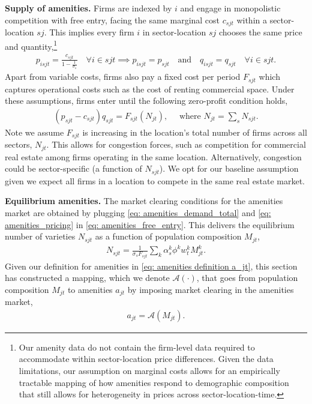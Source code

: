 \documentclass[11pt]{article}
\newcommand{\Paragraph}{\vspace{0.1cm}\noindent\textbf}
\begin{document}
\Paragraph{Supply of amenities.} Firms are indexed by $i$ and engage in monopolistic competition with free entry, facing the same marginal cost $c_{sjt}$ within a sector-location $sj$. This implies every firm $i$ in sector-location $sj$ chooses the same price and quantity,\footnote{Our amenity data do not contain the firm-level data required to accommodate within sector-location price differences. Given the data limitations, our assumption on marginal costs allows for an empirically tractable mapping of how amenities respond to demographic composition that still allows for heterogeneity in prices across sector-location-time.}
\begin{align}\label{eq: amenities_pricing}
    p_{isjt} = \frac{c_{sjt}}{1-\frac{1}{\sigma_s}} \quad \forall i \in sjt \implies p_{isjt} = p_{sjt} \quad \text{and} \quad q_{isjt} = q_{sjt} \quad \forall i \in sjt.
\end{align}
Apart from variable costs, firms also pay a fixed cost per period $F_{sjt}$ which captures operational costs such as the cost of renting commercial space. Under these assumptions, firms enter until the following zero-profit condition holds, 
\begin{align}\label{eq: amenities_free_entry}
     (p_{sjt}-c_{sjt})q_{sjt} = F_{sjt}(N_{jt}),\quad \text{ where } N_{jt}=\sum_s N_{sjt}.
\end{align}
Note we assume $F_{sjt}$ is increasing in the location's total number of firms across all sectors, $N_{jt}$. This allows for congestion forces, such as competition for commercial real estate among firms operating in the same location. Alternatively, congestion could be sector-specific (a function of $N_{sjt}$). We opt for our baseline assumption given we expect all firms in a location to compete in the same real estate market.

\Paragraph{Equilibrium amenities.} The market clearing conditions for the amenities market are obtained by plugging \ref{eq: amenities_demand_total} and \ref{eq: amenities_pricing} in \ref{eq: amenities_free_entry}. This delivers the equilibrium number of varieties $N_{sjt}$ as a function of population composition $M_{jt}$,
\begin{align}\label{eq: amenities_N}
N_{sjt} = \frac{1}{\sigma_s F_{sjt}}\sum_k \alpha_{s}^k \phi^kw^k_t M_{jt}^k.
\end{align}
Given our definition for amenities in \ref{eq: amenities definition a_jt}, this section has constructed a mapping, which we denote $\mathcal{A}(\cdot)$, that goes from population composition $M_{jt}$ to amenities $a_{jt}$ by imposing market clearing in the amenities market,
\begin{align}\label{eq: amenities_mapping}
    a_{jt} = \mathcal{A}(M_{jt}).
\end{align}
\vspace{-1cm}
\end{document}
